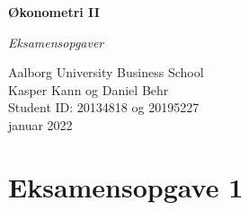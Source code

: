 \documentclass[
  10pt,
]{article}
\author{}
\date{\vspace{-2.5em}}
\begin{document}

\begin{centering}

\vspace{2 cm}

\Large

{\bf Økonometri II}

\vspace{1 cm}
{\it Eksamensopgaver}

\Large


\vspace{2 cm}

\normalsize


\vspace{12 cm}

\normalsize
Aalborg University Business School \\
Kasper Kann og Daniel Behr \\
Student ID: 20134818 og 20195227 \\
januar 2022

\vspace{2 cm}



\vspace{2 cm}


\end{centering}

\newpage

\pagestyle{fancy}

\fancyhead[LE,RO]{}
\fancyhead[LO,RE]{}

\renewcommand{\headrulewidth}{0.4pt}
\renewcommand{\footrulewidth}{0pt}


\FloatBarrier
\newpage

\FloatBarrier
\newpage


\setcounter{tocdepth}{4}

\tableofcontents

\newpage
\FloatBarrier


\FloatBarrier


\hypertarget{eksamensopgave-1}{%
\section{Eksamensopgave 1}\label{eksamensopgave-1}}
\end{document}

